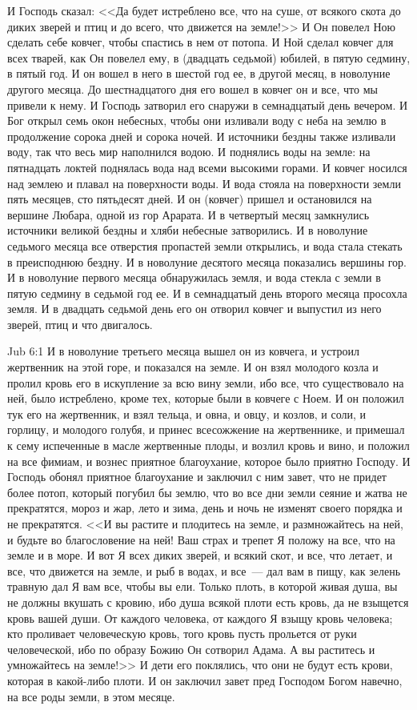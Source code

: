 И Господь сказал: <<Да будет истреблено все, что на суше, от всякого
скота до диких зверей и птиц и до всего, что движется на земле!>> И Он
повелел Ною сделать себе ковчег, чтобы спастись в нем от потопа. И Ной сделал
ковчег для всех тварей, как Он повелел ему, в (двадцать седьмой)
юбилей, в пятую седмину, в пятый год. И он вошел в него в шестой год ее, в
другой месяц, в новолуние другого месяца. До шестнадцатого дня его вошел в
ковчег он и все, что мы привели к нему. И Господь затворил его снаружи в
семнадцатый день вечером. И Бог открыл семь окон небесных, чтобы они
изливали воду с неба на землю в продолжение сорока дней и сорока ночей. И
источники бездны также изливали воду, так что весь мир наполнился водою. И
поднялись воды на земле: на пятнадцать локтей поднялась вода над всеми высокими
горами. И ковчег носился над землею и плавал на поверхности воды. И вода стояла
на поверхности земли пять месяцев, сто пятьдесят дней. И он (ковчег) пришел и
остановился на вершине Любара, одной из гор Арарата. И в четвертый месяц
замкнулись источники великой бездны и хляби небесные затворились. И в новолуние
седьмого месяца все отверстия пропастей земли открылись, и вода стала стекать в
преисподнюю бездну. И в новолуние десятого месяца показались вершины гор. И в
новолуние первого месяца обнаружилась земля, и вода стекла с земли в пятую
седмину в седьмой год ее. И в семнадцатый день второго месяца просохла земля. И
в двадцать седьмой день его он отворил ковчег и выпустил из него зверей,
птиц и что двигалось.

\vs Jub 6:1
И в новолуние третьего месяца вышел он из ковчега, и устроил жертвенник на
этой горе, и показался на земле. И он взял молодого козла и пролил кровь его в
искупление за всю вину земли, ибо все, что существовало на ней, было
истреблено, кроме тех, которые были в ковчеге с Ноем. И он положил тук его на
жертвенник, и взял тельца, и овна, и овцу, и козлов, и соли, и горлицу, и
молодого голубя, и принес всесожжение на жертвеннике, и примешал к сему
испеченные в масле жертвенные плоды, и возлил кровь и вино, и положил на все
фимиам, и вознес приятное благоухание, которое было приятно Господу. И Господь
обонял приятное благоухание и заключил с ним завет, что не придет более потоп,
который погубил бы землю, что во все дни земли сеяние и жатва не прекратятся,
мороз и жар, лето и зима, день и ночь не изменят своего порядка и не
прекратятся. <<И вы растите и плодитесь на земле, и размножайтесь на ней, и
будьте во благословение на ней! Ваш страх и трепет Я положу на все, что на
земле и в море. И вот Я всех диких зверей, и всякий скот, и все, что летает, и
все, что движется на земле, и рыб в водах, и все~--- дал вам в пищу, как
зелень травную дал Я вам все, чтобы вы ели. Только плоть, в которой живая душа,
вы не должны вкушать с кровию, ибо душа всякой плоти есть кровь, да не взыщется
кровь вашей души. От каждого человека, от каждого Я взыщу кровь человека; кто
проливает человеческую кровь, того кровь пусть прольется от руки человеческой,
ибо по образу Божию Он сотворил Адама. А вы раститесь и умножайтесь на
земле!>> И дети его поклялись, что они не будут есть крови, которая в
какой-либо плоти. И он заключил завет пред Господом Богом навечно, на все роды
земли, в этом месяце.

